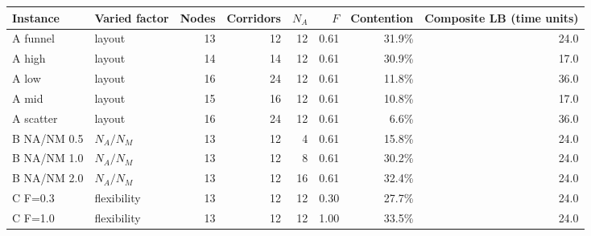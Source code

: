 \begin{tabular}{@{}llrrrrrr@{}}
\toprule
Instance & Varied factor & Nodes & Corridors & $N_A$ & $F$ & Contention & Composite LB (time units) \\
\midrule
A funnel & layout & 13 & 12 & 12 & 0.61 & 31.9\% & 24.0 \\
A high & layout & 14 & 14 & 12 & 0.61 & 30.9\% & 17.0 \\
A low & layout & 16 & 24 & 12 & 0.61 & 11.8\% & 36.0 \\
A mid & layout & 15 & 16 & 12 & 0.61 & 10.8\% & 17.0 \\
A scatter & layout & 16 & 24 & 12 & 0.61 & 6.6\% & 36.0 \\
\midrule
B NA/NM 0.5 & $N_A/N_M$ & 13 & 12 & 4 & 0.61 & 15.8\% & 24.0 \\
B NA/NM 1.0 & $N_A/N_M$ & 13 & 12 & 8 & 0.61 & 30.2\% & 24.0 \\
B NA/NM 2.0 & $N_A/N_M$ & 13 & 12 & 16 & 0.61 & 32.4\% & 24.0 \\
\midrule
C F=0.3 & flexibility & 13 & 12 & 12 & 0.30 & 27.7\% & 24.0 \\
C F=1.0 & flexibility & 13 & 12 & 12 & 1.00 & 33.5\% & 24.0 \\
\bottomrule
\end{tabular}
